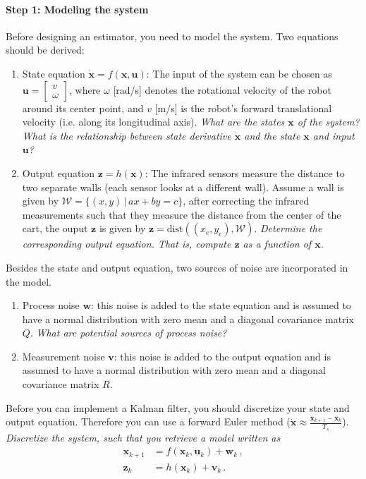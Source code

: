 \documentclass[10pt,a4paper]{article}
\begin{document}
\paragraph{Step 1: Modeling the system}
Before designing an estimator, you need to model the system. Two equations should be derived:
\begin{enumerate}
    \item State equation $\mathbf{\dot{x}} = f(\mathbf{x}, \mathbf{u})$: The input of the system can be chosen as $\mathbf{u} = \begin{bmatrix}v\\ \omega\end{bmatrix}$, where $\omega$ [rad/s] denotes the rotational velocity of the robot around its center point, and $v$ [m/s] is the robot's forward translational velocity (i.e. along its longitudinal axis).
    \textit{What are the states $\mathbf{x}$ of the system? What is the relationship between state derivative $\mathbf{\dot{x}}$ and the state $\mathbf{x}$ and input $\mathbf{u}$?}
    \item Output equation $\mathbf{z} = h(\mathbf{x})$: The infrared sensors measure the distance to two separate walls (each sensor looks at a different wall).
    Assume a wall is given by $\mathcal{W} = \{(x,y) \,|\, ax+by=c\}$, after correcting the infrared measurements such that they measure the distance from the center of the cart, the ouput $\mathbf{z}$ is given by $\mathbf{z} = \mathrm{dist}((x_\mathrm{c},y_\mathrm{c}), \mathcal{W})$. \textit{Determine the corresponding output equation. That is, compute $\mathbf{z}$ as a function of $\mathbf{x}$.}
\end{enumerate}
Besides the state and output equation, two sources of noise are incorporated in the model.
\begin{enumerate}
    \item Process noise $\mathbf{w}$: this noise is added to the state equation and is assumed to have a normal distribution with zero mean and a diagonal covariance matrix $Q$. \textit{What are potential sources of process noise?}
    \item Measurement noise $\mathbf{v}$: this noise is added to the output equation and is assumed to have a normal distribution with zero mean and a diagonal covariance matrix $R$.
\end{enumerate}
Before you can implement a Kalman filter, you should discretize your state and output equation. Therefore you can use a forward Euler method ($\mathbf{\dot{x}} \approx \frac{\mathbf{x}_{k+1}-\mathbf{x}_k}{T_s}$). \textit{Discretize the system, such that you retrieve a model written as}
\begin{equation}
\label{modelequations}
\begin{aligned}
    \mathbf{x}_{k+1} &= f(\mathbf{x}_k, \mathbf{u}_k) + \mathbf{w}_k\,,\\
    \mathbf{z}_{k} &= h(\mathbf{x}_k) + \mathbf{v}_k\,.
\end{aligned}
\end{equation}
\end{document}
